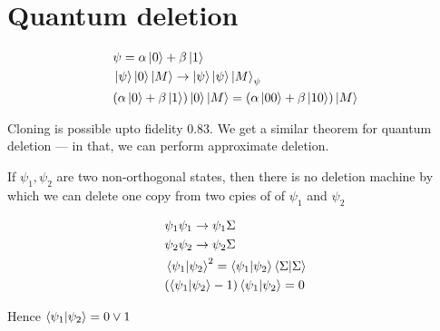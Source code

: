 \chapter{Quantum deletion}

\begin{align*}
    &\psi = \alpha \ket0 + \beta \ket 1 \\
    &\ket \psi \ket 0 \ket M \rightarrow \ket \psi \ket \psi \ket M_{\psi} \\
    &(\alpha \ket0 + \beta \ket 1) \ket 0 \ket M = (\alpha \ket{00} + \beta \ket{10}) \ket M \\
\end{align*}

Cloning is possible upto fidelity $0.83$. We get a similar theorem for
quantum deletion --- in that, we can perform approximate deletion.


If $\psi_1, \psi_2$ are two non-orthogonal states, then there is no deletion
machine by which we can delete one copy from two cpies of of $\psi_1$ and 
$\psi_2$

\begin{align*}
&\psi_1 \psi_1 \rightarrow \psi_1 \Sigma \\
&\psi_2 \psi_2 \rightarrow \psi_2 \Sigma \\
&\bra{\psi_1}\ket{\psi_2}^2 = \bra{\psi_1}\ket{\psi_2}\bra{\Sigma}\ket{\Sigma} \\
&(\bra{\psi_1}\ket{\psi_2} - 1) \bra{\psi_1}\ket{\psi_2} = 0
\end{align*}

Hence $\bra{\psi_1}\ket{\psi_2} = 0 \lor 1$

